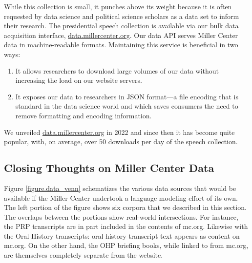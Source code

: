 \documentclass[12pt, oneside]{article}   	%
\begin{document}
While this collection is small, it punches above its weight because it is often requested by data science and political science scholars as a data set to inform their research.  The presidential speech collection is available  via our bulk data acquisition interface, \href{data.millercenter.org}{data.millercenter.org}.  Our data API serves Miller Center data in machine-readable formats.  Maintaining this service is beneficial in two ways:
\begin{enumerate}
\item It allows researchers to download large volumes of our data without increasing the load on our website servers.
\item It exposes our data to researchers in JSON format—a file encoding that is standard in the data science world and which saves consumers the need to remove formatting and encoding information.
\end{enumerate}
We unveiled \href{http://data.millercenter.org}{data.millercenter.org} in 2022 and since then it has become quite popular, with, on average, over 50 downloads per day of the speech collection.


\subsection{Closing Thoughts on Miller Center Data}\label{section.data.closing}
Figure \ref{figure.data_venn} schematizes the various data sources that would be available if the Miller Center undertook a language modeling effort of its own.  The left portion of the figure shows six corpora that we described in this section.  The overlaps between the portions show real-world intersections.  For instance, the PRP transcripts are in part included in the contents of mc.org.  Likewise with the Oral History transcripts: oral history transcript text appears as content on mc.org.  On the other hand, the OHP briefing books, while linked to from mc.org, are themselves completely separate from the website.
\end{document}
